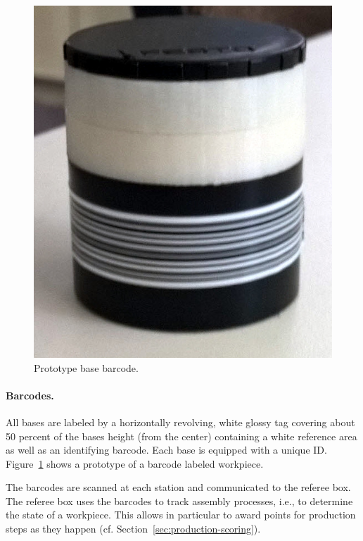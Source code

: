 \documentclass[12pt,twoside]{article}
\newcommand{\refsec}[1]{Section~\ref{#1}}
\newcommand{\reffig}[1]{Figure~\ref{#1}}
\begin{document}
\begin{figure}
  \centering
  \vspace{-2.7ex}
  \includegraphics[width=\linewidth]{figures/barcode-base}
  \caption{Prototype base barcode.}
  \label{fig:barcode}
\end{figure}
\paragraph{Barcodes.}
All bases are labeled by a horizontally revolving, white glossy tag
covering about 50 percent of the bases height (from the center)
containing a white reference area as well as an identifying
barcode. Each base is equipped with a unique ID. \reffig{fig:barcode}
shows a prototype of a barcode labeled workpiece.

The barcodes are scanned at each station and communicated to the
referee box. The referee box uses the barcodes to track assembly
processes, i.e., to determine the state of a workpiece. This allows in
particular to award points for production steps as they happen
(cf. \refsec{sec:production-scoring}).
\end{document}
